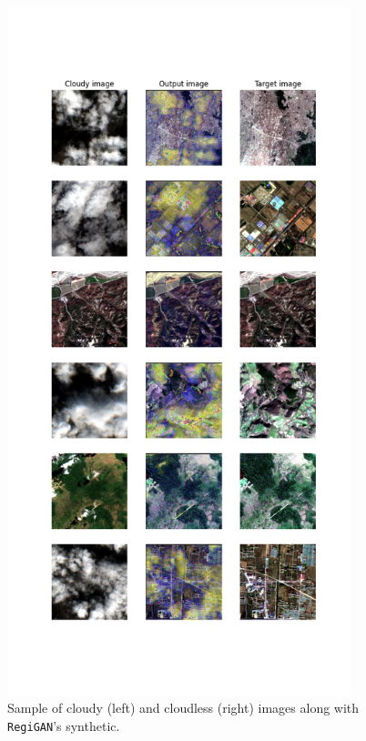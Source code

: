 \begin{figure}[H]
	\centering
	\includegraphics[width=10cm]{imgs/models/models/regigan.png}
	\caption{Sample of cloudy (left) and cloudless (right) images along with \texttt{RegiGAN}'s synthetic.}
	\label{fig:models-carla-loss}
\end{figure}

